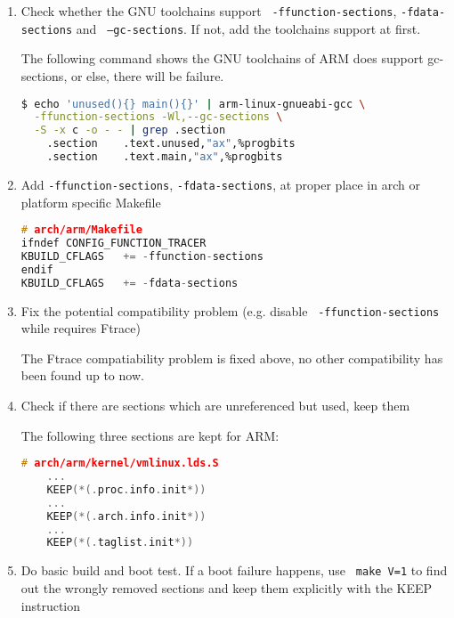 \documentclass[10pt,a4paper]{article}
\begin{document}
\begin{multicols}{2}
\begin{enumerate}
\item Check whether the GNU toolchains support {\small {\tt
-ffunction-sections}}, {\small {\tt -fdata-sections}} and {\small {\tt
--gc-sections}}. If not, add the toolchains support at first.

The following command shows the GNU toolchains of ARM does support gc-sections,
or else, there will be failure.

\begin{lstlisting}[language=bash,
                  commentstyle=\fontsize{7}{8}\selectfont,
                  basicstyle=\ttfamily\fontsize{7}{8}\selectfont]
$ echo 'unused(){} main(){}' | arm-linux-gnueabi-gcc \
  -ffunction-sections -Wl,--gc-sections \
  -S -x c -o - - | grep .section
	.section	.text.unused,"ax",%progbits
	.section	.text.main,"ax",%progbits
\end{lstlisting}

\item Add {\small {\tt -ffunction-sections}}, {\small {\tt -fdata-sections}},
at proper place in arch or platform specific Makefile

\begin{lstlisting}[language=c,
                  commentstyle=\fontsize{7}{8}\selectfont,
                  basicstyle=\ttfamily\fontsize{7}{8}\selectfont]
# arch/arm/Makefile
ifndef CONFIG_FUNCTION_TRACER
KBUILD_CFLAGS   += -ffunction-sections
endif
KBUILD_CFLAGS   += -fdata-sections
\end{lstlisting}

\item Fix the potential compatibility problem (e.g. disable {\small {\tt
-ffunction-sections}} while requires Ftrace)

The Ftrace compatiability problem is fixed above, no other compatibility has
been found up to now.

\item Check if there are sections which are unreferenced but used, keep them

The following three sections are kept for ARM:
\begin{lstlisting}[language=c,
                  commentstyle=\fontsize{7}{8}\selectfont,
                  basicstyle=\ttfamily\fontsize{7}{8}\selectfont]
# arch/arm/kernel/vmlinux.lds.S
	...
	KEEP(*(.proc.info.init*))
	...
	KEEP(*(.arch.info.init*))
	...
	KEEP(*(.taglist.init*))
\end{lstlisting}

\item Do basic build and boot test. If a boot failure happens, use {\small {\tt
make V=1}} to find out the wrongly removed sections and keep them
explicitly with the KEEP instruction


\end{enumerate}
\end{multicols}
\end{document}

